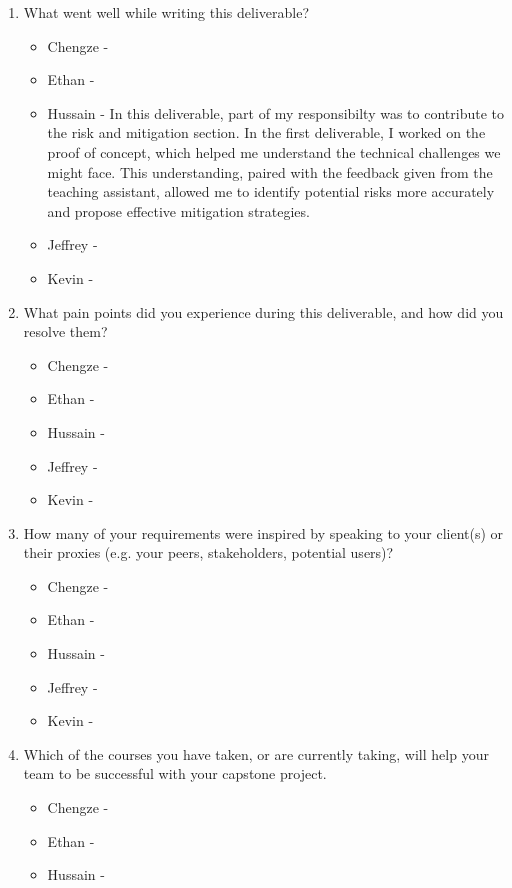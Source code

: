 \begin{enumerate}
  \item What went well while writing this deliverable?
  \begin{itemize}
        \item Chengze - 
        \item Ethan - 
        \item Hussain - In this deliverable, part of my responsibilty was to contribute to the risk and mitigation section. In the first deliverable, I worked on the proof of concept, which helped me understand the technical challenges we might face. This understanding, paired with the feedback given from the teaching assistant, allowed me to identify potential risks more accurately and propose effective mitigation strategies. 
        \item Jeffrey - 
        \item Kevin - 
  \end{itemize} 
  \item What pain points did you experience during this deliverable, and how did
  you resolve them?
  \begin{itemize}
        \item Chengze - 
        \item Ethan - 
        \item Hussain - 
        \item Jeffrey - 
        \item Kevin - 
  \end{itemize} 
  \item How many of your requirements were inspired by speaking to your
  client(s) or their proxies (e.g. your peers, stakeholders, potential users)?
  \begin{itemize}
        \item Chengze - 
        \item Ethan - 
        \item Hussain - 
        \item Jeffrey - 
        \item Kevin - 
  \end{itemize} 
  \item Which of the courses you have taken, or are currently taking, will help
  your team to be successful with your capstone project.
  \begin{itemize}
        \item Chengze - 
        \item Ethan - 
        \item Hussain - 

\end{itemize}
\end{enumerate}
